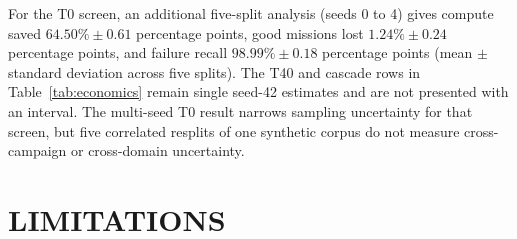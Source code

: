 \documentclass{IEEEtaes}
\begin{document}
For the T0 screen, an additional five-split analysis (seeds 0 to 4) gives compute saved $64.50\%\pm0.61$ percentage points, good missions lost $1.24\%\pm0.24$ percentage points, and failure recall $98.99\%\pm0.18$ percentage points (mean $\pm$ standard deviation across five splits). The T40 and cascade rows in Table~\ref{tab:economics} remain single seed-42 estimates and are not presented with an interval. The multi-seed T0 result narrows sampling uncertainty for that screen, but five correlated resplits of one synthetic corpus do not measure cross-campaign or cross-domain uncertainty.

\section{LIMITATIONS}
\label{sec:limitations}
\end{document}

